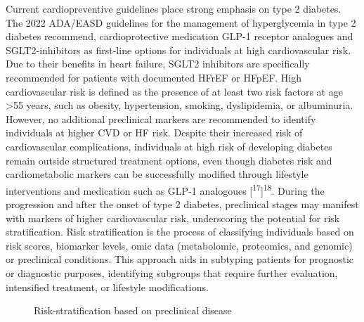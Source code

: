 \documentclass[
  a4paper,
  headsepline=true,
  open=any]{scrbook}
\begin{document}
Current cardiopreventive guidelines place strong emphasis on type 2
diabetes. The 2022 ADA/EASD guidelines for the management of
hyperglycemia in type 2 diabetes recommend, cardioprotective medication
GLP-1 receptor analogues and SGLT2-inhibitors as first-line options for
individuals at high cardiovascular risk. Due to their benefits in heart
failure, SGLT2 inhibitors are specifically recommended for patients with
documented HFrEF or HFpEF. High cardiovascular risk is defined as the
presence of at least two risk factors at age \textgreater55 years, such
as obesity, hypertension, smoking, dyslipidemia, or albuminuria.
However, no additional preclinical markers are recommended to identify
individuals at higher CVD or HF risk. Despite their increased risk of
cardiovascular complications, individuals at high risk of developing
diabetes remain outside structured treatment options, even though
diabetes risk and cardiometabolic markers can be successfully modified
through lifestyle interventions and medication such as GLP-1 analogoues
{[}\textsuperscript{17}{]}\textsuperscript{18}. During the progression
and after the onset of type 2 diabetes, preclinical stages may manifest
with markers of higher cardiovascular risk, underscoring the potential
for risk stratification. Risk stratification is the process of
classifying individuals based on risk scores, biomarker levels, omic
data (metabolomic, proteomics, and genomic) or preclinical conditions.
This approach aids in subtyping patients for prognostic or diagnostic
purposes, identifying subgroups that require further evaluation,
intensified treatment, or lifestyle modifications.

\begin{figure}

\begin{minipage}[t]{\linewidth}

{\centering 


\caption{Risk-stratification based on preclinical disease}

}

\end{minipage}%

\end{figure}
\end{document}
